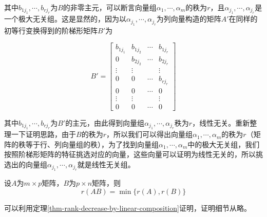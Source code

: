 其中$b_{1j_1},\cdots,b_{rj_r}$为$B$的非零主元，可以断言向量组$\alpha_1,\cdots,\alpha_m$的秩为$r$，且$\alpha_{j_1},\cdots,\alpha_{j_r}$是一个极大无关组。这是显然的，因为以$\alpha_{j_1},\cdots,\alpha_{j_r}$为列向量构造的矩阵$A'$在同样的初等行变换得到的阶梯形矩阵$B'$为

\[
    B'=\begin{bmatrix}
        b_{1j_1} & b_{1j_2} & \cdots & b_{1j_r} \\
        0 & b_{2j_2} & \cdots & b_{2j_r} \\
        \vdots & \vdots &  & \vdots \\
        0 & 0 & \cdots & b_{rj_r} \\
        0 & 0 & \cdots & 0 \\
        \vdots & \vdots & & \vdots \\
        0 & 0 & \cdots & 0
    \end{bmatrix}
\]

其中$b_{1j_1},\cdots,b_{rj_r}$为$B'$的主元，由此得到向量组$\alpha_{j_1},\cdots,\alpha_{j_r}$秩为$r$，线性无关。重新整理一下证明思路，由于$B$的秩为$r$，所以我们可以得出向量组$\alpha_1,\cdots,\alpha_m$的秩为$r$（矩阵的秩等于行、列向量组的秩），为了找到向量组$\alpha_1,\cdots,\alpha_m$中的极大无关组，我们按照阶梯形矩阵的特征挑选对应的向量，这些向量可以证明为线性无关的，所以挑选出的向量组$\alpha_{j_1},\cdots,\alpha_{j_r}$就是线性无关组。

\begin{thm}
    \label{thm-mat-rank-decrease-through-multiplication}
    设$A$为$m\times p$矩阵，$B$为$p\times n$矩阵，则
    \[ r(AB)=\min\{r(A),r(B)\} \]
\end{thm}

可以利用定理\ref{thm-rank-decrease-by-linear-composition}证明，证明细节从略。
